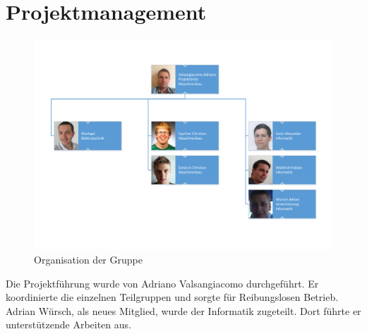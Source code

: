 \section{Projektmanagement}

\begin{figure}[h!]
	\centering
	\includegraphics[width=1.0\linewidth]{../../fig/Organigramm.pdf}
	\caption{Organisation der Gruppe}
	\label{fig:Organigramm}
\end{figure}

\noindent
Die Projektführung wurde von Adriano Valsangiacomo durchgeführt. Er
koordinierte die einzelnen Teilgruppen und sorgte für Reibungslosen
Betrieb. Adrian Würsch, als neues Mitglied, wurde der Informatik
zugeteilt. Dort führte er unterstützende Arbeiten aus.


\newpage

\newpage

\newpage